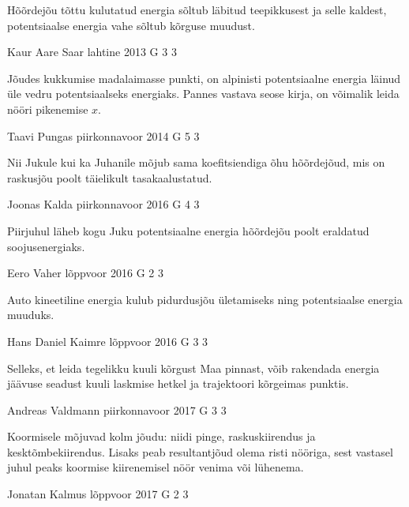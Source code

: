 \documentclass[11pt]{article}
\begin{document}
{{\ifHint
Hõõrdejõu tõttu kulutatud energia sõltub läbitud teepikkusest ja selle kaldest, potentsiaalse energia vahe sõltub kõrguse muudust.
\fi
}

{Kaur Aare Saar} %
{lahtine} %
{2013} %
{G 3} %
{3} %
{

\ifHint
Jõudes kukkumise madalaimasse punkti, on alpinisti potentsiaalne energia läinud üle vedru potentsiaalseks energiaks. Pannes vastava seose kirja, on võimalik leida nööri pikenemise $x$.
\fi
}

{Taavi Pungas} %
{piirkonnavoor} %
{2014} %
{G 5} %
{3} %
{

\ifHint
Nii Jukule kui ka Juhanile mõjub sama koefitsiendiga õhu hõõrdejõud, mis on raskusjõu poolt täielikult tasakaalustatud.
\fi
}

{Joonas Kalda} %
{piirkonnavoor} %
{2016} %
{G 4} %
{3} %
{

\ifHint
Piirjuhul läheb kogu Juku potentsiaalne energia hõõrdejõu poolt eraldatud soojusenergiaks.
\fi
}

{Eero Vaher} %
{lõppvoor} %
{2016} %
{G 2} %
{3} %
{

\ifHint
Auto kineetiline energia kulub pidurdusjõu ületamiseks ning potentsiaalse energia muuduks.
\fi
}

{Hans Daniel Kaimre} %
{lõppvoor} %
{2016} %
{G 3} %
{3} %
{

\ifHint
Selleks, et leida tegelikku kuuli kõrgust Maa pinnast, võib rakendada energia jäävuse seadust kuuli laskmise hetkel ja trajektoori kõrgeimas punktis.
\fi
}

{Andreas Valdmann} %
{piirkonnavoor} %
{2017} %
{G 3} %
{3} %
{

\ifHint
Koormisele mõjuvad kolm jõudu: niidi pinge, raskuskiirendus ja kesktõmbekiirendus. Lisaks peab resultantjõud olema risti nööriga, sest vastasel juhul peaks koormise kiirenemisel nöör venima või lühenema.
\fi
}

{Jonatan Kalmus} %
{lõppvoor} %
{2017} %
{G 2} %
{3} %
{

}}
\end{document}
